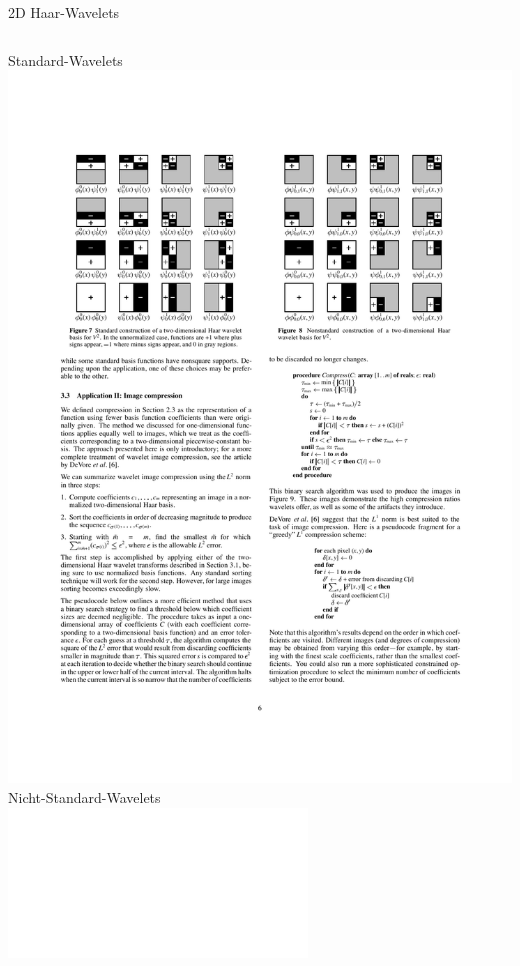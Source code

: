 	{
	\begin{frame}{2D Haar-Wavelets}
		\begin{columns}[T, onlytextwidth]
			\centering
			\alert{Standard-Wavelets}\vspace{4mm}\\
			\includegraphics[trim=79 545 325 100, clip, width=\textwidth]{2d_wavelets.pdf}
			\centering
			\pause[4]
			\alert{Nicht-Standard-Wavelets}\vspace{4mm}\\
			\includegraphics<4-7>[trim=325 545 79 100, clip, width=\textwidth]{2d_wavelets.pdf}
		\end{columns}
	\end{frame}}

